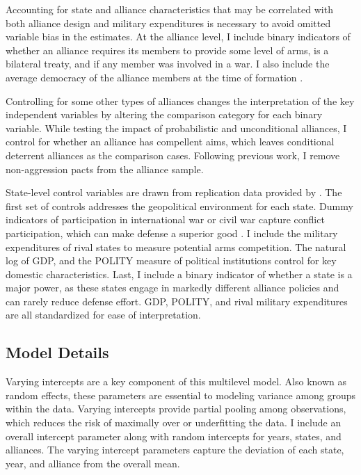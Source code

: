 \documentclass[12pt]{article}
\begin{document}
Accounting for state and alliance characteristics that may be correlated with both alliance design and military expenditures is necessary to avoid omitted variable bias in the estimates. At the alliance level, I include binary indicators of whether an alliance requires its members to provide some level of arms, is a bilateral treaty, and if any member was involved in a war. I also include the average democracy of the alliance members at the time of formation \citep{Chibaetal2015}. 

Controlling for some other types of alliances changes the interpretation of the key independent variables by altering the comparison category for each binary variable. While testing the impact of probabilistic and unconditional alliances, I control for whether an alliance has compellent aims, which leaves conditional deterrent alliances as the comparison cases. Following previous work, I remove non-aggression pacts from the alliance sample. 

State-level control variables are drawn from replication data provided by \citet{DigiuseppePoast2016}. The first set of controls addresses the geopolitical environment for each state. Dummy indicators of participation in international war or civil war capture conflict participation, which can make defense a superior good \citep{OlsonZeckhauser1966}. I include the military expenditures of rival states to measure potential arms competition. The natural log of GDP, and the POLITY measure of political institutions control for key domestic characteristics. Last, I include a binary indicator of whether a state is a major power, as these states engage in markedly different alliance policies and can rarely reduce defense effort. GDP, POLITY, and rival military expenditures are all standardized for ease of interpretation. 


\subsection*{Model Details}

Varying intercepts are a key component of this multilevel model. Also known as random effects, these parameters are essential to modeling variance among groups within the data. Varying intercepts provide partial pooling among observations, which reduces the risk of maximally over or underfitting the data. I include an overall intercept parameter along with random intercepts for years, states, and alliances. The varying intercept parameters capture the deviation of each state, year, and alliance from the overall mean. 
\end{document}
